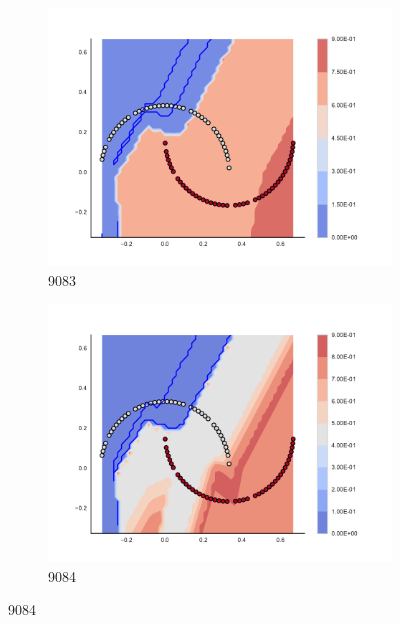 \begin{figure}[h]
\begin{subfigure}[b]{0.09\textwidth}
    \includegraphics[clip, trim=2.35cm 1.75cm 4.5cm 0cm,width=\textwidth]{img/convergence/9083.pdf}
    \caption{9083}
    \label{fig:convergence_9083}
\end{subfigure}
%
\begin{subfigure}[b]{0.09\textwidth}
    \includegraphics[clip, trim=2.35cm 1.75cm 4.5cm 0cm,width=\textwidth]{img/convergence/9084.pdf}
    \caption{9084}
    \label{fig:convergence_9084}
\end{subfigure}
%
        \end{figure}
